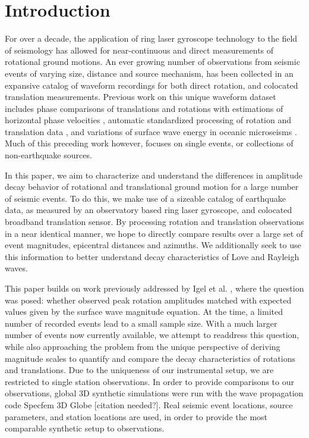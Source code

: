 \documentclass{gji}
\begin{document}
\section{Introduction} 
For over a decade, the application of ring laser gyroscope technology to the field of seismology has allowed for near-continuous and direct measurements of rotational ground motions. An ever growing number of observations from seismic events of varying size, distance and source mechanism, has been collected in an expansive catalog of waveform recordings for both direct rotation, and colocated translation measurements.
Previous work on this unique waveform dataset includes phase comparisons of translations and rotations with estimations of horizontal phase velocities \cite{igel2005rotational},
automatic standardized processing of rotation and translation data \cite{salvermoser2017event}, and
variations of surface wave energy in oceanic microseisms \cite{tanimoto2016seasonal}.
Much of this preceding work however, focuses on single events, or collections of non-earthquake sources.

In this paper, we aim to characterize and understand the differences in amplitude decay behavior of rotational and translational ground motion for a large number of seismic events. To do this, we make use of a sizeable catalog of earthquake data, as measured by an observatory based ring laser gyroscope, and colocated broadband translation sensor. By processing rotation and translation observations in a near identical manner, we hope to directly compare results over a large set of event magnitudes, epicentral distances and  azimuths. We additionally seek to use this information to better understand decay characteristics of Love and Rayleigh waves.

This paper builds on work previously addressed by Igel et al. , 
where the question was posed: whether observed peak rotation amplitudes matched with expected values given by the surface wave magnitude equation. At the time, a limited number of recorded events lead to a small sample size. With a much larger number of events now currently available, we attempt to readdress this question, while also approaching the problem from the unique perspective of deriving magnitude scales to quantify and compare the decay characteristics of rotations and translations. Due to the uniqueness of our instrumental setup, we are restricted to single station observations. In order to provide comparisons to our observations, global 3D synthetic simulations were run with the wave propagation code Specfem 3D Globe [citation needed?]. Real seismic event locations, source parameters, and station locations are used, in order to provide the most comparable synthetic setup to observations. 
\end{document}
